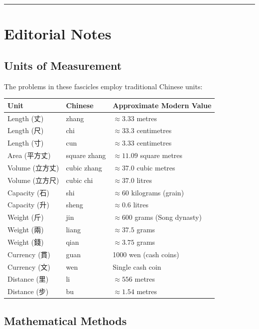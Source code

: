 \documentclass[11pt,a4paper]{article}
\newcommand{\longline}{\noindent\rule{\textwidth}{0.4pt}}
\begin{document}
\vspace{0.5em}
\longline

\newpage
\section*{Editorial Notes}

\subsection*{Units of Measurement}

The problems in these fascicles employ traditional Chinese units:

\begin{longtable}{lll}
\toprule
\textbf{Unit} & \textbf{Chinese} & \textbf{Approximate Modern Value} \\
\midrule
\endfirsthead
Length (丈) & zhang & $\approx 3.33$ metres \\
Length (尺) & chi & $\approx 33.3$ centimetres \\
Length (寸) & cun & $\approx 3.33$ centimetres \\
Area (平方丈) & square zhang & $\approx 11.09$ square metres \\
Volume (立方丈) & cubic zhang & $\approx 37.0$ cubic metres \\
Volume (立方尺) & cubic chi & $\approx 37.0$ litres \\
Capacity (石) & shi & $\approx 60$ kilograms (grain) \\
Capacity (升) & sheng & $\approx 0.6$ litres \\
Weight (斤) & jin & $\approx 600$ grams (Song dynasty) \\
Weight (兩) & liang & $\approx 37.5$ grams \\
Weight (錢) & qian & $\approx 3.75$ grams \\
Currency (貫) & guan & 1000 wen (cash coins) \\
Currency (文) & wen & Single cash coin \\
Distance (里) & li & $\approx 556$ metres \\
Distance (步) & bu & $\approx 1.54$ metres \\
\bottomrule
\end{longtable}

\subsection*{Mathematical Methods}
\end{document}
